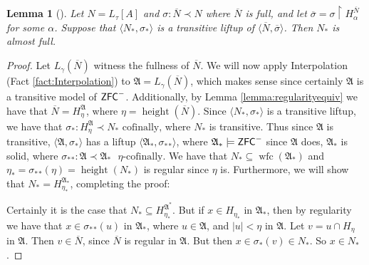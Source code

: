 \documentclass{amsart}
\newtheorem{lemma}[theorem]{Lemma}
\theoremstyle{definition}
\theoremstyle{remark}
\newcommand{\N}{{\overline{N}}}
\newcommand{\ZFC}{\textup{\ensuremath{\textsf{ZFC}}}}
\DeclareMathOperator{\height}{height}
\DeclareMathOperator{\wfc}{wfc}
\newcommand{\rest}{\mathbin{\upharpoonright}}
\begin{document}
\begin{lemma}[{\cite[Lemma 2.1]{Jensen:2014}}] \label{lemma:liftupfull} Let  $N= L_\tau[A]$ and $\sigma: \N \prec N$ where $\N$ is full, and let $\overline \sigma=\sigma\rest H_\alpha^{\N}$ for some $\alpha$. Suppose that $\langle N_*, \sigma_* \rangle$ is a transitive liftup of $\langle \N, \overline \sigma \rangle$. Then $N_*$ is almost full. \end{lemma}
\begin{proof}
	Let $L_\gamma(\N)$ witness the fullness of $\N$. We will now apply Interpolation (Fact \ref{fact:Interpolation}) to $\mathfrak A= L_\gamma(\N)$, which makes sense since certainly $\mathfrak A$ is a transitive model of $\ZFC^-$. Additionally, by Lemma \ref{lemma:regularityequiv} we have that $\N = H_\eta^{\mathfrak A}$, where $\eta = \height(\N)$. 
	Since $\langle N_*, \sigma_* \rangle$ is a transitive liftup, we have that $\sigma_*: H_\eta^{\mathfrak A} \prec N_* \text{ cofinally,}$ where $N_*$ is transitive. Thus since $\mathfrak A$ is transitive, $\langle \mathfrak A, \sigma_* \rangle$ has a liftup $\langle \mathfrak A_*, {\sigma_*}_* \rangle$, where $\mathfrak A_* \models \ZFC^-$ since $\mathfrak A$ does, $\mathfrak A_*$ is solid, where ${\sigma_*}_* : \mathfrak A \prec \mathfrak A_* \text{ $\eta$-cofinally.}$ 
	We have that  $N_* \subseteq \wfc({\mathfrak A}_*)$ and $\eta_*= {\sigma_*}_*(\eta)=\height(N_*)$ is regular since $\eta$ is. Furthermore, we will show that $N_* = H_{\eta_*}^{\mathfrak A_*}$, completing the proof:
	
	Certainly it is the case that $N_* \subseteq H_{\eta_*}^{\mathfrak A^*}$. 
	But if $x \in H_{\eta_*}$ in $\mathfrak A_*$, then by regularity we have that $x \in {\sigma_*}_*(u)$ in $\mathfrak A_*$, where $u \in \mathfrak A$, and $|u| < \eta$ in $\mathfrak A$. Let $v=u \cap H_\eta$ in $\mathfrak A$. Then $v \in \N$, since $\N$ is regular in $\mathfrak A$. But then $x \in \sigma_*(v) \in N_*$. So $x \in N_*$.
\end{proof}
\end{document}
